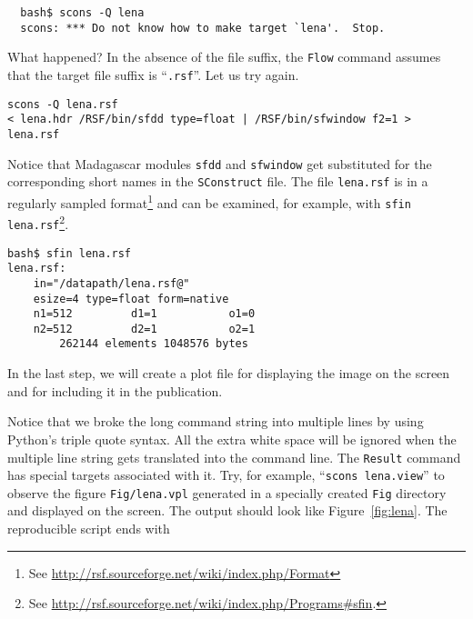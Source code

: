 
%
\begin{verbatim}
  bash$ scons -Q lena
  scons: *** Do not know how to make target `lena'.  Stop.
\end{verbatim}
What happened? In the absence of the file suffix, the \texttt{Flow}
command assumes that the target file suffix is ``\texttt{.rsf}''. Let us try again.
\begin{verbatim}
scons -Q lena.rsf
< lena.hdr /RSF/bin/sfdd type=float | /RSF/bin/sfwindow f2=1 > lena.rsf
\end{verbatim}
Notice that Madagascar modules \texttt{sfdd} and \texttt{sfwindow} get
substituted for the corresponding short names in the
\texttt{SConstruct} file. The file \texttt{lena.rsf} is in a regularly
sampled format\footnote{See \url{http://rsf.sourceforge.net/wiki/index.php/Format}} and can be examined, for example, with \texttt{sfin lena.rsf}\footnote{See \url{http://rsf.sourceforge.net/wiki/index.php/Programs\#sfin}.}.
\begin{verbatim}
bash$ sfin lena.rsf
lena.rsf:
    in="/datapath/lena.rsf@"
    esize=4 type=float form=native
    n1=512         d1=1           o1=0
    n2=512         d2=1           o2=1
        262144 elements 1048576 bytes
\end{verbatim}
In the last step, we will create a plot file for displaying the image
on the screen and for including it in the publication.
%

%
Notice that we broke the long command string into multiple lines by
using Python's triple quote syntax. All the extra white space will be
ignored when the multiple line string gets translated into the command
line.  The \texttt{Result} command has special targets associated with
it. Try, for example, ``\texttt{scons lena.view}'' to observe the
figure \texttt{Fig/lena.vpl} generated in a specially created
\texttt{Fig} directory and displayed on the screen. The output should
look like Figure~\ref{fig:lena}.
%
%
The reproducible script ends with\\
%


